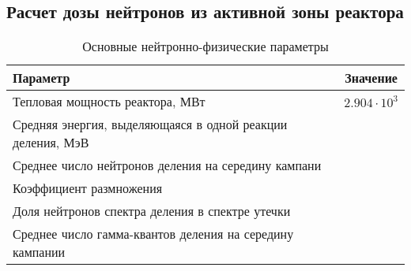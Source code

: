 \subsection{Расчет дозы нейтронов из активной зоны реактора}

\begin{table}[H]
	\caption{Основные нейтронно-физические параметры}
	\begin{center}
        \begin{tabular}{|l|c|}
        \toprule
         Параметр & Значение \\ 
         \midrule
         \hline
         Тепловая мощность реактора, МВт & $2.904 \cdot 10^3$ \\ 
         \hline
         Средняя энергия, выделяющаяся в одной реакции деления, МэВ &  \\ 
         \hline
         Среднее число нейтронов деления на середину кампани & \\
         \hline
         Коэффициент размножения &  \\ 
         \hline
         Доля нейтронов спектра деления в спектре утечки &  \\ 
         \hline
         Среднее число гамма-квантов деления на середину кампании &  \\ 
         \bottomrule
		\end{tabular}
		\label{tabular:turbine}
	\end{center}
\end{table}